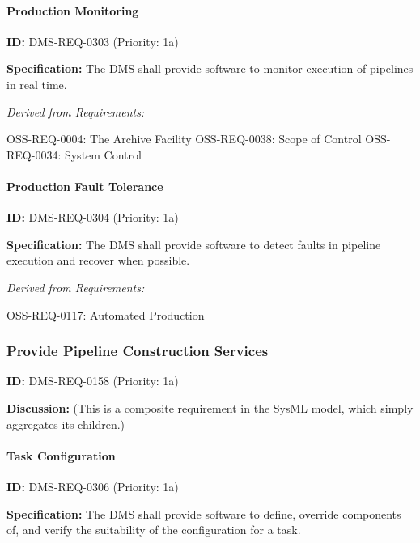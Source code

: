 \documentclass[SE,toc,lsstdraft]{lsstdoc}
\begin{document}
\paragraph{Production Monitoring}\hfill  %

\label{DMS-REQ-0303}
\textbf{ID:} DMS-REQ-0303 (Priority: 1a)

\textbf{Specification:} The DMS shall provide software to monitor execution of pipelines in real time.

\emph{Derived from Requirements:}

OSS-REQ-0004:
The Archive Facility \newline
OSS-REQ-0038:
Scope of Control \newline
OSS-REQ-0034:
System Control \newline

\paragraph{Production Fault Tolerance}\hfill  %

\label{DMS-REQ-0304}
\textbf{ID:} DMS-REQ-0304 (Priority: 1a)

\textbf{Specification:} The DMS shall provide software to detect faults in pipeline execution and recover when possible.

\emph{Derived from Requirements:}

OSS-REQ-0117:
Automated Production \newline

\subsubsection{Provide Pipeline Construction Services}

\label{DMS-REQ-0158}
\textbf{ID:} DMS-REQ-0158 (Priority: 1a)

\textbf{Discussion:}
    (This is a composite requirement in the SysML model, which simply aggregates its children.)

\paragraph{Task Configuration}\hfill  %

\label{DMS-REQ-0306}
\textbf{ID:} DMS-REQ-0306 (Priority: 1a)

\textbf{Specification:} The DMS shall provide software to define, override components of, and verify the suitability of the configuration for a task.
\end{document}
